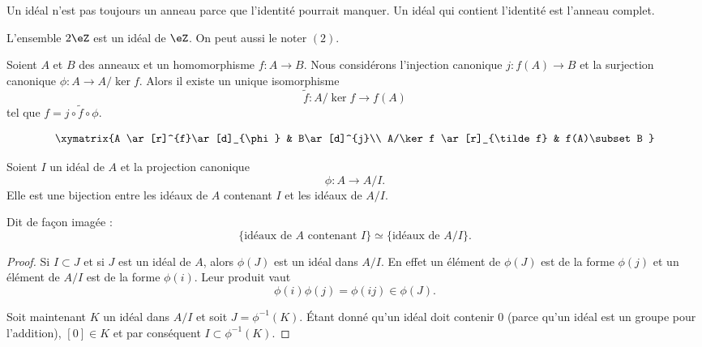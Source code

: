\begin{remark}
    Un idéal n'est pas toujours un anneau parce que l'identité pourrait manquer. Un idéal qui contient l'identité est l'anneau complet.
\end{remark}

\begin{example}
    L'ensemble \( 2\eZ\) est un idéal de \( \eZ\). On peut aussi le noter \( (2) \).
\end{example}

\begin{proposition}
    Soient \( A\) et \( B\) des anneaux et un homomorphisme \( f\colon A\to B\). Nous considérons l'injection canonique \( j\colon f(A)\to B\) et la surjection canonique \( \phi\colon A\to A/\ker f\). Alors il existe un unique isomorphisme
    \begin{equation}
        \tilde f \colon A/\ker f\to f(A)
    \end{equation}
    tel que \( f=j\circ\tilde f\circ\phi\).

    \begin{equation}
        \xymatrix{%
        A \ar[r]^{f}\ar[d]_{\phi}        &   B\ar[d]^{j}\\
           A/\ker f \ar[r]_{\tilde f}   &   f(A)\subset B
           }
    \end{equation}
\end{proposition}

\begin{proposition}     \label{PropIJJIdsousphi}
    Soient \( I\) un idéal de \( A\) et la projection canonique
    \begin{equation}
        \phi\colon A\to A/I.
    \end{equation}
    Elle est une bijection entre les idéaux de \( A\) contenant \( I\) et les idéaux de \( A/I\).

    Dit de façon imagée :
    \begin{equation}        \label{EqKbrizu}
        \{ \text{idéaux de } A\text{ contenant } I\}\simeq\{ \text{idéaux de } A/I \}.
    \end{equation}
\end{proposition}

\begin{proof}
    Si \( I\subset J\) et si \( J \) est un idéal de \( A\), alors \( \phi(J)\) est un idéal dans \( A/I\). En effet un élément de \( \phi(J)\) est de la forme \( \phi(j)\) et un élément de \( A/I\) est de la forme \( \phi(i)\). Leur produit vaut
    \begin{equation}
        \phi(i)\phi(j)=\phi(ij)\in\phi(J).
    \end{equation}

    Soit maintenant \( K\) un idéal dans \( A/I\) et soit \( J=\phi^{-1}(K)\). Étant donné qu'un idéal doit contenir \( 0\) (parce qu'un idéal est un groupe pour l'addition), \( [0]\in K\) et par conséquent \( I\subset\phi^{-1}(K)\).
\end{proof}

